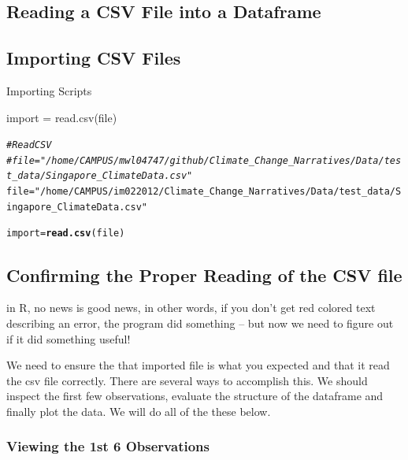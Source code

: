 \documentclass{article}\usepackage[]{graphicx}\usepackage[]{color}
\makeatletter
\newcommand{\hlstr}[1]{\textcolor[rgb]{0.192,0.494,0.8}{#1}}%
\newcommand{\hlcom}[1]{\textcolor[rgb]{0.678,0.584,0.686}{\textit{#1}}}%
\newcommand{\hlstd}[1]{\textcolor[rgb]{0.345,0.345,0.345}{#1}}%
\newcommand{\hlkwb}[1]{\textcolor[rgb]{0.69,0.353,0.396}{#1}}%
\newcommand{\hlkwd}[1]{\textcolor[rgb]{0.737,0.353,0.396}{\textbf{#1}}}%
\newenvironment{kframe}{%
 \def\at@end@of@kframe{}%
 \ifinner\ifhmode%
  \def\at@end@of@kframe{\end{minipage}}%
  \begin{minipage}{\columnwidth}%
 \fi\fi%
 \def\FrameCommand##1{\hskip\@totalleftmargin \hskip-\fboxsep
 \colorbox{shadecolor}{##1}\hskip-\fboxsep
     \hskip-\linewidth \hskip-\@totalleftmargin \hskip\columnwidth}%
 \MakeFramed {\advance\hsize-\width
   \@totalleftmargin\z@ \linewidth\hsize
   \@setminipage}}%
 {\par\unskip\endMakeFramed%
 \at@end@of@kframe}
\newenvironment{knitrout}{}{} %
\makeatother
\begin{document}
\subsection{Reading a CSV File into a Dataframe}


\subsection{Importing CSV Files}


Importing Scripts


import = read.csv(file)

\begin{knitrout}
\color{fgcolor}\begin{kframe}
\begin{alltt}
\hlcom{# Read CSV}
\hlcom{#file = "/home/CAMPUS/mwl04747/github/Climate_Change_Narratives/Data/test_data/Singapore_ClimateData.csv"}
\hlstd{file} \hlkwb{=} \hlstr{"/home/CAMPUS/im022012/Climate_Change_Narratives/Data/test_data/Singapore_ClimateData.csv"}

\hlstd{import} \hlkwb{=} \hlkwd{read.csv}\hlstd{(file)}
\end{alltt}
\end{kframe}
\end{knitrout}

\subsection{Confirming the Proper Reading of the CSV file}

in R, no news is good news, in other words, if you don't get red colored text describing an error, the program did something -- but now we need to figure out if it did something useful!

We need to ensure the that imported file is what you expected and that it read the csv file correctly. There are several ways to accomplish this. We should inspect the first few observations, evaluate the structure of the dataframe and finally plot the data. We will do all of the these below.

\subsubsection{Viewing the 1st 6 Observations}
\end{document}
